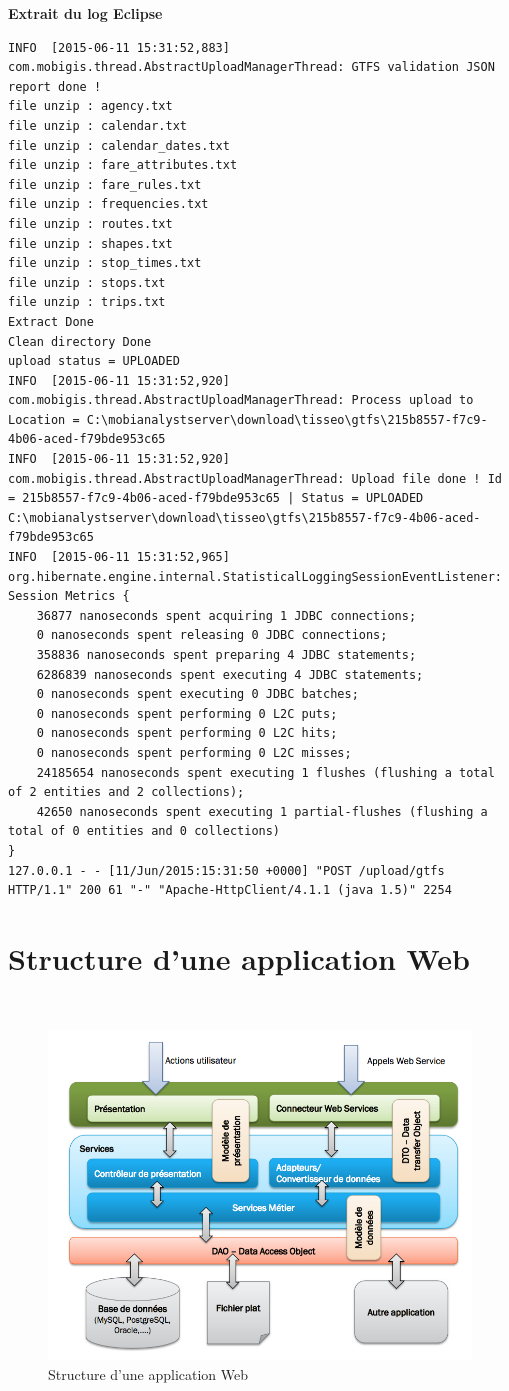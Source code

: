 \textbf{Extrait du log Eclipse}\\

\begin{lstlisting}
INFO  [2015-06-11 15:31:52,883] com.mobigis.thread.AbstractUploadManagerThread: GTFS validation JSON report done !
file unzip : agency.txt
file unzip : calendar.txt
file unzip : calendar_dates.txt
file unzip : fare_attributes.txt
file unzip : fare_rules.txt
file unzip : frequencies.txt
file unzip : routes.txt
file unzip : shapes.txt
file unzip : stop_times.txt
file unzip : stops.txt
file unzip : trips.txt
Extract Done
Clean directory Done
upload status = UPLOADED
INFO  [2015-06-11 15:31:52,920] com.mobigis.thread.AbstractUploadManagerThread: Process upload to Location = C:\mobianalystserver\download\tisseo\gtfs\215b8557-f7c9-4b06-aced-f79bde953c65
INFO  [2015-06-11 15:31:52,920] com.mobigis.thread.AbstractUploadManagerThread: Upload file done ! Id = 215b8557-f7c9-4b06-aced-f79bde953c65 | Status = UPLOADED
C:\mobianalystserver\download\tisseo\gtfs\215b8557-f7c9-4b06-aced-f79bde953c65
INFO  [2015-06-11 15:31:52,965] org.hibernate.engine.internal.StatisticalLoggingSessionEventListener: Session Metrics {
    36877 nanoseconds spent acquiring 1 JDBC connections;
    0 nanoseconds spent releasing 0 JDBC connections;
    358836 nanoseconds spent preparing 4 JDBC statements;
    6286839 nanoseconds spent executing 4 JDBC statements;
    0 nanoseconds spent executing 0 JDBC batches;
    0 nanoseconds spent performing 0 L2C puts;
    0 nanoseconds spent performing 0 L2C hits;
    0 nanoseconds spent performing 0 L2C misses;
    24185654 nanoseconds spent executing 1 flushes (flushing a total of 2 entities and 2 collections);
    42650 nanoseconds spent executing 1 partial-flushes (flushing a total of 0 entities and 0 collections)
}
127.0.0.1 - - [11/Jun/2015:15:31:50 +0000] "POST /upload/gtfs HTTP/1.1" 200 61 "-" "Apache-HttpClient/4.1.1 (java 1.5)" 2254
\end{lstlisting} 


\pagebreak

\section{Structure d'une application Web}\label{Annexe E}\\


\begin{figure}[!h]
\centering
\includegraphics[width=\textwidth]{images/WebAppArchitecture.png}
\caption{\label{WebAppArchitecture}Structure d'une application Web}
\end{figure} 

